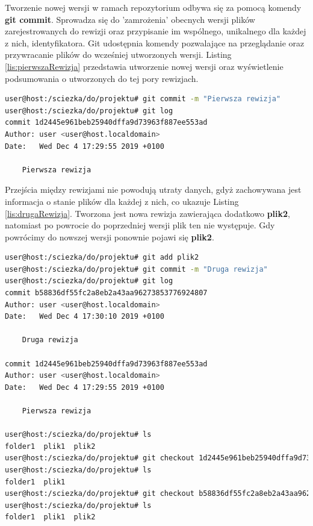 Tworzenie nowej wersji w ramach repozytorium odbywa się za pomocą komendy \textbf{git commit}. Sprowadza się do 'zamrożenia' obecnych wersji plików zarejestrowanych do rewizji oraz przypisanie im wspólnego, unikalnego dla każdej z nich, identyfikatora. Git udostępnia komendy pozwalające na przeglądanie oraz przywracanie plików do wcześniej utworzonych wersji. Listing \ref{lis:pierwszaRewizja} przedstawia utworzenie nowej wersji oraz wyświetlenie podsumowania o utworzonych do tej pory rewizjach.

\begin{lstlisting}[label={lis:pierwszaRewizja}, language=bash,caption={Utworzenie nowej rewizji}]
user@host:/sciezka/do/projektu# git commit -m "Pierwsza rewizja"
user@host:/sciezka/do/projektu# git log 
commit 1d2445e961beb25940dffa9d73963f887ee553ad
Author: user <user@host.localdomain>
Date:   Wed Dec 4 17:29:55 2019 +0100

    Pierwsza rewizja
\end{lstlisting}

Przejścia między rewizjami nie powodują utraty danych, gdyż zachowywana jest informacja o stanie plików dla każdej z nich, co ukazuje Listing \ref{lis:drugaRewizja}. Tworzona jest nowa rewizja zawierająca dodatkowo \textbf{plik2}, natomiast po powrocie do poprzedniej wersji plik ten nie występuje. Gdy powrócimy do nowszej wersji ponownie pojawi się \textbf{plik2}.

\begin{lstlisting}[language=bash,caption={Podsumowanie rewizji, powrót do starszej wersji},label={lis:drugaRewizja}]
user@host:/sciezka/do/projektu# git add plik2
user@host:/sciezka/do/projektu# git commit -m "Druga rewizja"
user@host:/sciezka/do/projektu# git log 
commit b58836df55fc2a8eb2a43aa96273853776924807
Author: user <user@host.localdomain>
Date:   Wed Dec 4 17:30:10 2019 +0100

    Druga rewizja

commit 1d2445e961beb25940dffa9d73963f887ee553ad
Author: user <user@host.localdomain>
Date:   Wed Dec 4 17:29:55 2019 +0100

    Pierwsza rewizja

user@host:/sciezka/do/projektu# ls
folder1  plik1  plik2
user@host:/sciezka/do/projektu# git checkout 1d2445e961beb25940dffa9d73963f887ee553ad
user@host:/sciezka/do/projektu# ls
folder1  plik1
user@host:/sciezka/do/projektu# git checkout b58836df55fc2a8eb2a43aa96273853776924807
user@host:/sciezka/do/projektu# ls
folder1  plik1  plik2
\end{lstlisting}

